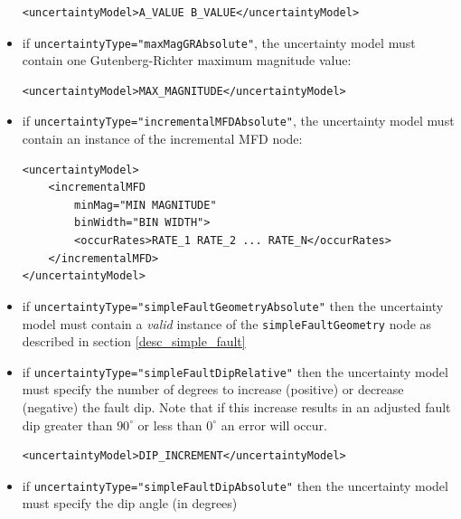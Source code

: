 \begin{itemize}
    \begin{verbatim}
<uncertaintyModel>A_VALUE B_VALUE</uncertaintyModel>
	\end{verbatim}

    \item if \Verb+uncertaintyType="maxMagGRAbsolute"+, the uncertainty
	model must contain one Gutenberg-Richter maximum magnitude value:

    \begin{verbatim}
<uncertaintyModel>MAX_MAGNITUDE</uncertaintyModel>
	\end{verbatim}
	
	\item if \Verb+uncertaintyType="incrementalMFDAbsolute"+, the uncertainty model must contain an instance of the incremental MFD node:
	
    \begin{verbatim}
<uncertaintyModel>
    <incrementalMFD
        minMag="MIN MAGNITUDE"
        binWidth="BIN WIDTH">
        <occurRates>RATE_1 RATE_2 ... RATE_N</occurRates>
    </incrementalMFD>
</uncertaintyModel>
    \end{verbatim}

    \item if \Verb+uncertaintyType="simpleFaultGeometryAbsolute"+ then the uncertainty model must contain a \emph{valid} instance of the \verb+simpleFaultGeometry+ node as described in section \ref{desc_simple_fault}

    \item if \Verb+uncertaintyType="simpleFaultDipRelative"+ then the uncertainty model must specify the number of degrees to increase (positive) or decrease (negative) the fault dip. Note that if this increase results in an adjusted fault dip greater than $90^{\circ}$ or less than $0^{\circ}$ an error will occur.
     
    \begin{verbatim}
<uncertaintyModel>DIP_INCREMENT</uncertaintyModel>
	\end{verbatim}

	\item if \Verb+uncertaintyType="simpleFaultDipAbsolute"+ then the uncertainty model must specify the dip angle (in degrees)


\end{itemize}
